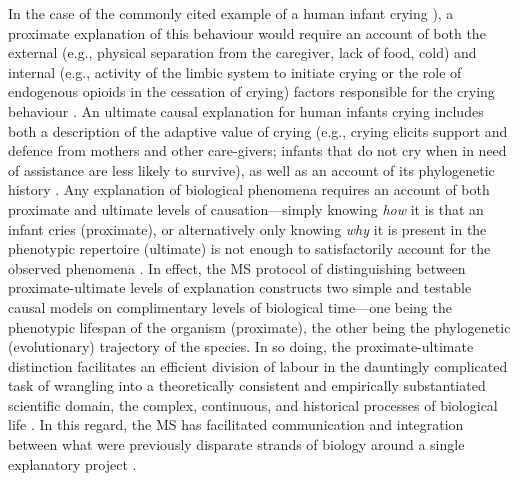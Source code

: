 In the case of the commonly cited example of a human infant crying \citep[taken from][]{Scott-Phillips2011,Nettle2009}), a proximate explanation of this behaviour would require an account of both the external (e.g., physical separation from the caregiver, lack of food, cold) and internal (e.g., activity of the limbic system to initiate crying or the role of endogenous opioids in the cessation of crying) factors responsible for the crying behaviour \citep[38]{Scott-Phillips2011}. An ultimate causal explanation for human infants crying includes both a description of the adaptive value of crying (e.g., crying elicits support and defence from mothers and other care-givers; infants that do not cry when in need of assistance are less likely to survive), as well as an account of its phylogenetic history \citep{Mayr1961,Tinbergen1963}.
Any explanation of biological phenomena requires an account of both proximate and ultimate levels of causation---simply knowing \textit{how} it is that an infant cries (proximate), or alternatively only knowing \textit{why} it is present in the phenotypic repertoire (ultimate) is not enough to satisfactorily account for the observed phenomena \citep[38]{Scott-Phillips2011}.  In effect, the MS protocol of distinguishing between proximate-ultimate levels of explanation constructs two simple and testable causal models on complimentary levels of biological time---one being the phenotypic lifespan of the organism (proximate), the other being the phylogenetic (evolutionary) trajectory of the species. In so doing, the proximate-ultimate distinction facilitates an efficient division of labour in the dauntingly complicated task of wrangling into a theoretically consistent and empirically substantiated scientific domain, the complex, continuous, and historical processes of biological life \citep{Mayr1961}. In this regard, the MS has facilitated communication and integration between what were previously disparate strands of biology around a single explanatory project \citep{Svensson2017}.

